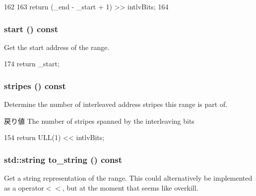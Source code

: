 \begin{DoxyCode}
162     {
163         return (_end - _start + 1) >> intlvBits;
164     }
\end{DoxyCode}
\hypertarget{classAddrRange_a85325674b7aed05d6b4e40a48563189b}{
\subsubsection[{start}]{ start () const}}
\label{classAddrRange_a85325674b7aed05d6b4e40a48563189b}
Get the start address of the range. 


\begin{DoxyCode}
174 { return _start; }
\end{DoxyCode}
\hypertarget{classAddrRange_a922914e9ba305472e1643f0be3b6ab01}{
\subsubsection[{stripes}]{ stripes () const}}
\label{classAddrRange_a922914e9ba305472e1643f0be3b6ab01}
Determine the number of interleaved address stripes this range is part of.

\begin{DoxyReturn}{戻り値}
The number of stripes spanned by the interleaving bits 
\end{DoxyReturn}



\begin{DoxyCode}
154 { return ULL(1) << intlvBits; }
\end{DoxyCode}
\hypertarget{classAddrRange_aa48c39f92bc04eded742f5310c74aafe}{
\subsubsection[{to\_\-string}]{\setlength{\rightskip}{0pt plus 5cm}std::string to\_\-string () const}}
\label{classAddrRange_aa48c39f92bc04eded742f5310c74aafe}
Get a string representation of the range. This could alternatively be implemented as a operator$<$$<$, but at the moment that seems like overkill. 


